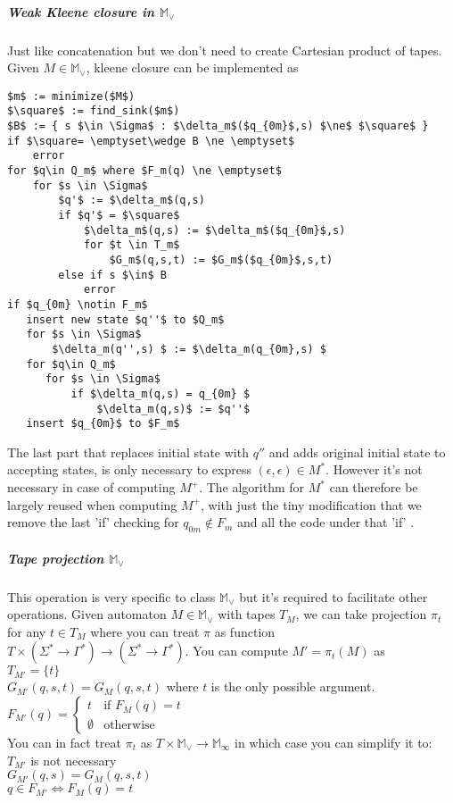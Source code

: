 \documentclass[12pt]{article}
\begin{document}
\subparagraph{Weak Kleene closure in $\mathbb{M}_\vee$} Just like concatenation but we don't need to create Cartesian product of tapes. Given $M \in \mathbb{M}_\vee$, kleene closure can be implemented as

\begin{lstlisting}
$m$ := minimize($M$)
$\square$ := find_sink($m$)
$B$ := { s $\in \Sigma$ : $\delta_m$($q_{0m}$,s) $\ne$ $\square$ }
if $\square= \emptyset\wedge B \ne \emptyset$
    error
for $q\in Q_m$ where $F_m(q) \ne \emptyset$ 
    for $s \in \Sigma$
        $q'$ := $\delta_m$(q,s)
        if $q'$ = $\square$ 
            $\delta_m$(q,s) := $\delta_m$($q_{0m}$,s)
            for $t \in T_m$
                $G_m$(q,s,t) := $G_m$($q_{0m}$,s,t)
        else if s $\in$ B
            error
if $q_{0m} \notin F_m$
   insert new state $q''$ to $Q_m$
   for $s \in \Sigma$
       $\delta_m(q'',s) $ := $\delta_m(q_{0m},s) $
   for $q\in Q_m$
      for $s \in \Sigma$
          if $\delta_m(q,s) = q_{0m} $
              $\delta_m(q,s)$ := $q''$
   insert $q_{0m}$ to $F_m$
\end{lstlisting}
The last part that replaces initial state with $q''$ and adds original initial state to accepting states, is only necessary to express $(\epsilon,\epsilon) \in M^*$. However it's not necessary in case of computing $M^+$. The algorithm for $M^*$ can therefore be largely reused when computing $M^+$, with just the tiny modification that we remove the last 'if' checking for $q_{0m} \notin F_m$ and all the code under that 'if' .
  

\subparagraph{Tape projection $\mathbb{M}_\vee$} This operation is very specific to class $\mathbb{M}_\vee$ but it's required to facilitate other operations. Given automaton $M \in \mathbb{M}_\vee$ with tapes $T_M$, we can take projection $\pi_t$ for any $t\in T_M$ where you can treat $\pi$ as function $T \times (\Sigma^* \rightarrow \Gamma^*) \rightarrow (\Sigma^* \rightarrow \Gamma^*)$. You can compute $M' = \pi_t(M)$ as \\
 $T_{M'} = \{t\}$ \\
 $G_{M'}(q,s,t) = G_M(q,s,t)$ where $t$ is the only possible argument. \\
 $F_{M'}(q) = \begin{cases}
 t & \mbox{if } F_M(q) = t \\
 \emptyset & \mbox{otherwise}
 \end{cases}$ \\
 You can in fact treat $\pi_t$ as $T \times \mathbb{M}_\vee \rightarrow \mathbb{M}_\infty$ in which case you can simplify it to: \\
  $T_{M'}$ is not necessary \\
 $G_{M'}(q,s) = G_M(q,s,t)$ \\
 $q \in F_{M'} \iff F_M(q) = t$ \\
\end{document}
